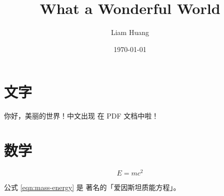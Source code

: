 \documentclass[UTF8]{ctexart}
\title{What a Wonderful World}
\author{Liam Huang}
\date{\today}
\begin{document}
\maketitle
\section{文字}
你好，美丽的世界！中文出现
在 PDF 文档中啦！
\section{数学}
\begin{equation}
  E = mc^{2}\label{eqn:mass-energy}
\end{equation}

公式 \ref{eqn:mass-energy} 是
著名的「爱因斯坦质能方程」。
\end{document}
